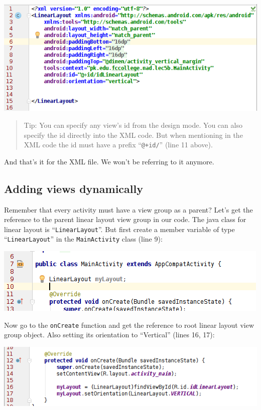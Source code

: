 \begin{center}
	\includegraphics[scale=0.4]{chapters/ch05/images/16}
\end{center}

\begin{quote}
	Tip: You can specify any view's id from the design mode. You can also specify the id directly into the XML code. But when mentioning in the XML code the id must have a prefix ``\texttt{@+id/}'' (line 11 above).
\end{quote}

And that's it for the XML file. We won't be referring to it anymore.

\subsection{Adding views dynamically}
\label{sec:addViewsDynamically}
Remember that every activity must have a view group as a parent? Let's get the reference to the parent linear layout view group in our code. The java class for linear layout is ``\texttt{LinearLayout}''. But first create a member variable of type ``\texttt{LinearLayout}'' in the \texttt{MainActivity} class (line 9):

\begin{center}
	\includegraphics[scale=0.4]{chapters/ch05/images/17}
\end{center}

Now go to the \texttt{onCreate} function and get the reference to root linear layout view group object. Also setting its orientation to ``Vertical'' (lines 16, 17):

\begin{center}
	\includegraphics[scale=0.4]{chapters/ch05/images/18}
\end{center}


